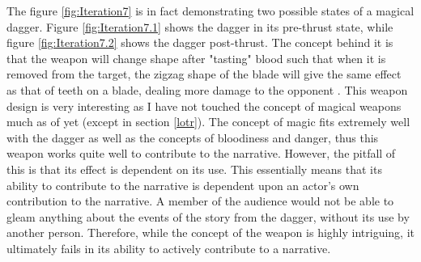 \documentclass{article}
\begin{document}
The figure \ref{fig:Iteration7} is in fact demonstrating two possible states of a magical dagger. Figure \ref{fig:Iteration7.1} shows the dagger in its pre-thrust state, while figure \ref{fig:Iteration7.2} shows the dagger post-thrust. The concept behind it is that the weapon will change shape after "tasting" blood such that when it is removed from the target, the zigzag shape of the blade will give the same effect as that of teeth on a blade, dealing more damage to the opponent \parencite{kvietkova2015effect}. This weapon design is very interesting as I have not touched the concept of magical weapons much as of yet (except in section \ref{lotr}). The concept of magic fits extremely well with the dagger as well as the concepts of bloodiness and danger, thus this weapon works quite well to contribute to the narrative. However, the pitfall of this is that its effect is dependent on its use. This essentially means that its ability to contribute to the narrative is dependent upon an actor's own contribution to the narrative. A member of the audience would not be able to gleam anything about the events of the story from the dagger, without its use by another person. Therefore, while the concept of the weapon is highly intriguing, it ultimately fails in its ability to actively contribute to a narrative.

\pagebreak

\printbibliography

\pagebreak
\end{document}
